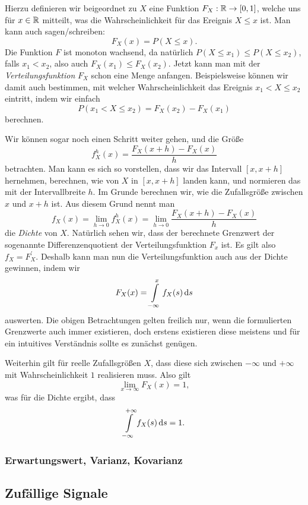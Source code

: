 Hierzu definieren wir beigeordnet zu $X$ eine Funktion $F_X: \mathbb{R} \rightarrow [0,1]$, welche uns für $x \in \mathbb{R}$ mitteilt, was die Wahrscheinlichkeit für das Ereignis $X \leqslant x$ ist.
Man kann auch sagen/schreiben:
\[
F_X(x) = P(X \leqslant x).
\]
Die Funktion $F$ ist monoton wachsend, da natürlich $P(X \leqslant x_1) \leqslant P(X \leqslant x_2)$, falls $x_1 < x_2$, also auch $F_X(x_1) \leqslant F_X(x_2)$.
Jetzt kann man mit der \emph{Verteilungsfunktion} $F_X$ schon eine Menge anfangen.
Beispielsweise k\"onnen wir damit auch bestimmen, mit welcher Wahrscheinlichkeit das Ereignis $x_1 < X \leqslant x_2$ eintritt, indem wir einfach 
\[
P(x_1 < X \leqslant x_2) = F_X(x_2) - F_X(x_1)
\]
berechnen.

Wir k\"onnen sogar noch einen Schritt weiter gehen, und die Gr\"oße
\[
f^h_X(x) = \frac{F_X(x + h) - F_X(x)}{h}
\]
betrachten.
Man kann es sich so vorstellen, dass wir das Intervall $[x,x+h]$ hernehmen, berechnen, wie  von $X$ in $[x,x+h]$ landen kann, und normieren das mit der Intervallbreite $h$.
Im Grunde berechnen wir, wie  die Zufallsgr\"oße zwischen $x$ und $x+h$ ist.
Aus diesem Grund nennt man
\[
f_X(x) = \lim\limits_{h \rightarrow 0} f^h_X(x) = \lim\limits_{h \rightarrow 0} \frac{F_X(x + h) - F_X(x)}{h}
\]
die \emph{Dichte} von $X$.
Natürlich sehen wir, dass der berechnete Grenzwert der sogenannte Differenzenquotient der Verteilungsfunktion $F_x$ ist. Es gilt also $f_X = F^\prime_X$.
Deshalb kann man nun die Verteilungsfunktion auch aus der Dichte gewinnen, indem wir
\[
F_X(x) = {\int\limits_{-\infty}^{x}{f_X(s)}\,\mathrm{d}{s}}
\]
auswerten.
Die obigen Betrachtungen gelten freilich nur, wenn die formulierten Grenzwerte auch immer existieren, doch erstens existieren diese meistens und für ein intuitives Verständnis sollte es zunächst genügen.

Weiterhin gilt für reelle Zufallsgrößen $X$, dass diese sich  zwischen $-\infty$ und $+\infty$ mit Wahrscheinlichkeit $1$ realisieren muss.
Also gilt
\[
\lim_{x \rightarrow \infty} F_X(x) = 1,
\]
was für die Dichte ergibt, dass
\[
{\int\limits_{-\infty}^{+\infty}{f_X(s)}\,\mathrm{d}{s}} = 1.
\]

\subsubsection{Erwartungswert, Varianz, Kovarianz}


\subsection{Zufällige Signale}

